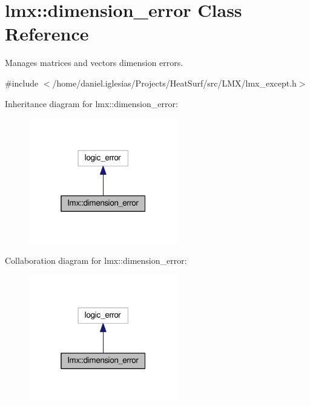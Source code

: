 \hypertarget{classlmx_1_1dimension__error}{\section{lmx\-:\-:dimension\-\_\-error Class Reference}
\label{classlmx_1_1dimension__error}
}


Manages matrices and vectors dimension errors.  




{\ttfamily \#include $<$/home/daniel.\-iglesias/\-Projects/\-Heat\-Surf/src/\-L\-M\-X/lmx\-\_\-except.\-h$>$}



Inheritance diagram for lmx\-:\-:dimension\-\_\-error\-:
\nopagebreak
\begin{figure}[H]
\begin{center}
\leavevmode
\includegraphics[width=184pt]{classlmx_1_1dimension__error__inherit__graph}
\end{center}
\end{figure}


Collaboration diagram for lmx\-:\-:dimension\-\_\-error\-:
\nopagebreak
\begin{figure}[H]
\begin{center}
\leavevmode
\includegraphics[width=184pt]{classlmx_1_1dimension__error__coll__graph}
\end{center}
\end{figure}
